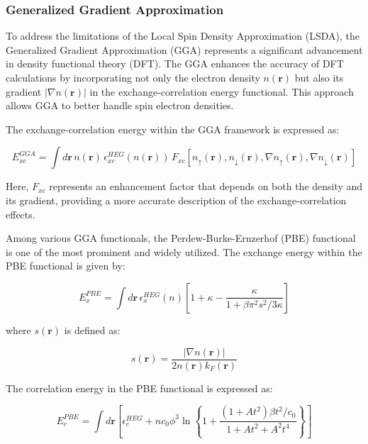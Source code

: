 \subsubsection{Generalized Gradient Approximation}
\label{subsubsection.GGA}
To address the limitations of the Local Spin Density Approximation (LSDA), the Generalized Gradient Approximation (GGA) represents a significant advancement in density functional theory (DFT). The GGA enhances the accuracy of DFT calculations by incorporating not only the electron density \(n(\mathbf{r})\) but also its gradient \(|\nabla n(\mathbf{r})|\) in the exchange-correlation energy functional. This approach allows GGA to better handle spin electron densities.

The exchange-correlation energy within the GGA framework is expressed as:

\begin{equation}
	E_{xc}^{GGA} = \int d \mathbf{r} \, n (\mathbf{r}) \, \epsilon_{xc}^{HEG} (n(\mathbf{r})) \, F_{xc} \left[n_\uparrow(\mathbf{r}), n_\downarrow(\mathbf{r}), \nabla n_\uparrow(\mathbf{r}), \nabla n_\downarrow(\mathbf{r}) \right]
\end{equation}

Here, \(F_{xc}\) represents an enhancement factor that depends on both the density and its gradient, providing a more accurate description of the exchange-correlation effects.

Among various GGA functionals, the Perdew-Burke-Ernzerhof (PBE) functional is one of the most prominent and widely utilized. The exchange energy within the PBE functional is given by:

\begin{equation}
	E_{x}^{PBE} = \int d \mathbf{r} \, \epsilon_{x}^{HEG} (n) \left[1+ \kappa - \dfrac{\kappa}{1+ \beta \pi^{2}s^{2}/3 \kappa}\right]
\end{equation}

where \(s(\mathbf{r})\) is defined as:

\begin{equation}
	s(\mathbf{r}) = \dfrac{|\nabla n (\mathbf{r})|}{2 n (\mathbf{r}) k_{F}(\mathbf{r})}
\end{equation}

The correlation energy in the PBE functional is expressed as:

\begin{equation}
	E_{c}^{PBE} = \int d \mathbf{r} \left[\epsilon_{c}^{HEG} + n c_0 \phi^{3} \ln \left\{1+ \dfrac{(1+At^2)\beta t^{2}/c_0}{1+A t^{2}+A^{2}t^{4}}\right\}\right]
\end{equation}

